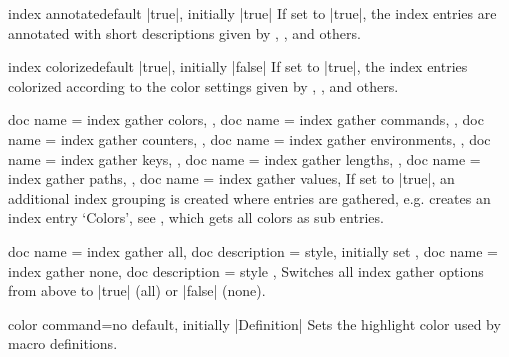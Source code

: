 \begin{docTcbKey}{index annotate}{}{default |true|, initially |true|}
  If set to |true|, the index entries are annotated with short descriptions
  given by , ,
  and others.
\end{docTcbKey}

\begin{docTcbKey}{index colorize}{}{default |true|, initially |false|}
  If set to |true|, the index entries colorized according to the color
  settings given by , ,
  and others.
\end{docTcbKey}


\begin{docTcbKeys}[
    doc new={2022-06-20},
    doc parameter = {\colOpt{=true\textbar false}},
    doc description = {default |true|, initially |true|}
  ]
  {
    {
      doc name        = index gather colors,
    },
    {
      doc name        = index gather commands,
    },
    {
      doc name        = index gather counters,
    },
    {
      doc name        = index gather environments,
    },
    {
      doc name        = index gather keys,
    },
    {
      doc name        = index gather lengths,
    },
    {
      doc name        = index gather paths,
    },
    {
      doc name        = index gather values,
    }
  }
  If set to |true|, an additional index grouping is created where entries
  are gathered, e.g.  creates an index
  entry `Colors', see , which gets all colors
  as sub entries.
\end{docTcbKeys}


\begin{docTcbKeys}[
    doc new={2022-06-20},
    doc parameter = {},
  ]
  {
    {
      doc name        = index gather all,
      doc description = {style, initially set}
    },
    {
      doc name        = index gather none,
      doc description = {style}
    },
  }
  Switches all index gather options from above to |true| (all) or |false| (none).
\end{docTcbKeys}

\clearpage

\begin{docTcbKey}{color command}{=}{no default, initially |Definition|}
  Sets the highlight color used by macro definitions.
\end{docTcbKey}

